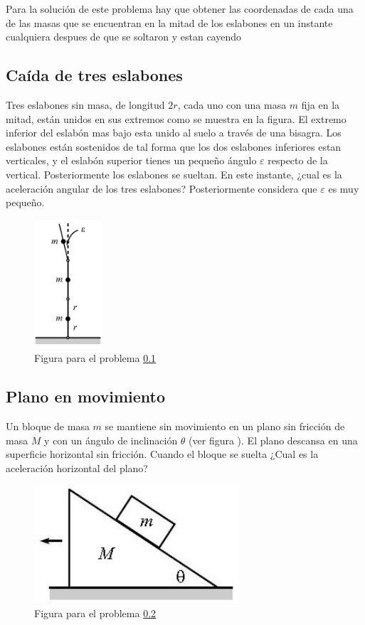 \documentclass[12pt]{book}
\theoremstyle{definition}
\theoremstyle{remark}
\theoremstyle{plain}
\begin{document}
Para la solución de este problema hay que obtener las coordenadas de cada una de las masas que se encuentran en la mitad de los eslabones en un instante cualquiera despues de que se soltaron y estan cayendo

\subsection{Caída de tres eslabones}
\label{p1}
Tres eslabones sin masa, de longitud $2 r$, cada uno con una masa $m$ fija en la mitad, están unidos en sus extremos como se muestra en la figura. El extremo inferior del eslabón mas bajo esta unido al suelo a través de una bisagra. Los eslabones están sostenidos de tal forma que los dos eslabones inferiores estan verticales, y el eslabón superior tienes un pequeño ángulo $\varepsilon$ respecto de la vertical. Posteriormente los eslabones se sueltan. En este instante, ¿cual es la aceleración angular de los tres eslabones? Posteriormente considera que $\varepsilon$ es muy pequeño.

\begin{figure}
\centering
\includegraphics[width=1in]{treseslabones.jpeg}
\caption{Figura para el problema \ref{p1}}
\label{fig1}
\end{figure}



\subsection{Plano en movimiento}
\label{p2}
Un bloque de masa $m$ se mantiene sin movimiento en un plano sin fricción de masa $M$ y con un ángulo de inclinación $\theta$ (ver figura ). El plano descansa en una superficie horizontal sin fricción. Cuando el bloque se suelta ¿Cual es la aceleración horizontal del plano?
\begin{figure}
\centering
\includegraphics[width=3in]{planomoviendose.jpeg}
\caption{Figura para el problema \ref{p2}}
\label{fig2}
\end{figure}
\end{document}
